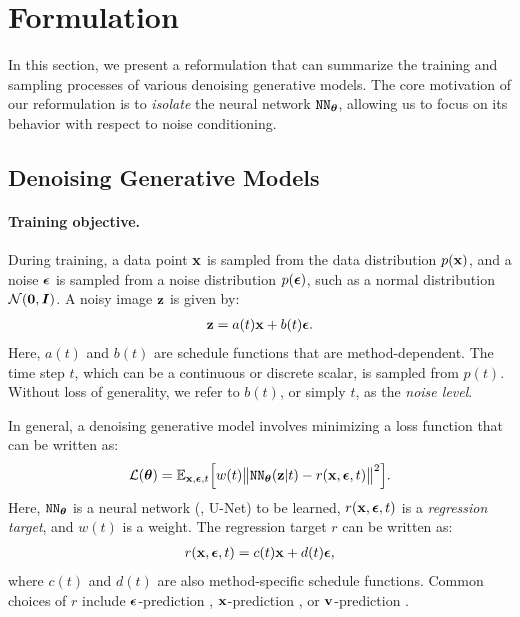 \section{Formulation}\label{sec:formulation}

In this section, we present a reformulation that can summarize the training and sampling processes of various denoising generative models. The core motivation of our reformulation is to \textit{isolate} the neural network ${\texttt{NN}}_{{\bm{\theta}}}$, allowing us to focus on its behavior with respect to noise conditioning.


\subsection{Denoising Generative Models}\label{subsec:gs}

\paragraph{Training objective.}
During training, a data point ${\mathbf{x}}$ is sampled from the data distribution $p({\mathbf{x}})$, and a noise ${\bm{\epsilon}}$ is sampled from a noise distribution $p({\bm{\epsilon}})$, such as a normal distribution $\mathcal{N}(\bm 0,{\bm{I}})$. A noisy image ${\mathbf{z}}$ is given by:
\begin{align}
    \label{eq:z_cal}
    {\mathbf{z}} = a(t){\mathbf{x}} + b(t){\bm{\epsilon}}.
\end{align} 
Here, $a(t)$ and $b(t)$ are schedule functions that are method-dependent.
The time step $t$, which can be a continuous or discrete scalar, is sampled from $p(t)$. Without loss of generality, we refer to $b(t)$, or simply $t$, as the \textit{noise level}.

In general, a denoising generative model involves minimizing a loss function that can be written as:
\begin{align}
    \label{eq:gs_loss}
    \mathcal{L}({\bm{\theta}}) = \mathbb{E}_{{\mathbf{x}},{\bm{\epsilon}},t}\Big[w(t)\big\|{\texttt{NN}}_{{\bm{\theta}}}({\mathbf{z}}|t)-r({\mathbf{x}},{\bm{\epsilon}},t)\big\|^2\Big].
\end{align}
\vspace{.5em}
Here, ${\texttt{NN}}_{{\bm{\theta}}}$ is a neural network (\eg, U-Net) to be learned, $r({\mathbf{x}},{\bm{\epsilon}},t)$ is a \textit{regression target}, and $w(t)$ is a weight.
The regression target $r$ can be written as:
\begin{align}
    \label{eq:T_cal}
 r({\mathbf{x}},{\bm{\epsilon}},t) = c(t){\mathbf{x}}+d(t){\bm{\epsilon}},
\end{align}
where $c(t)$ and $d(t)$ are also method-specific schedule functions. Common choices of $r$ include ${\bm{\epsilon}}$-prediction \cite{ho2020denoising}, ${\mathbf{x}}$-prediction \cite{salimans2022progressive}, or ${\mathbf{v}}$-prediction \cite{salimans2022progressive,lipman2023flow}.

